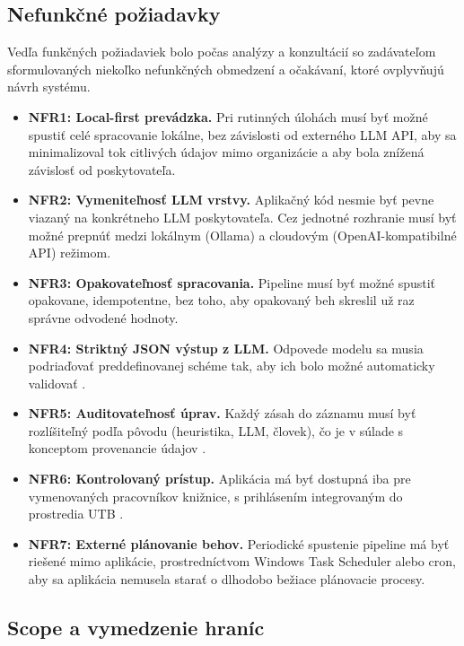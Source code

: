 \subsection{Nefunkčné požiadavky}

Vedľa funkčných požiadaviek bolo počas analýzy a konzultácií so zadávateľom sformulovaných niekoľko nefunkčných obmedzení a očakávaní, ktoré ovplyvňujú návrh systému.

\begin{itemize}
    \item \textbf{NFR1: Local-first prevádzka.} Pri rutinných úlohách musí byť možné spustiť celé spracovanie lokálne, bez závislosti od externého LLM API, aby sa minimalizoval tok citlivých údajov mimo organizácie a aby bola znížená závislosť od poskytovateľa.
    \item \textbf{NFR2: Vymeniteľnosť LLM vrstvy.} Aplikačný kód nesmie byť pevne viazaný na konkrétneho LLM poskytovateľa. Cez jednotné rozhranie musí byť možné prepnúť medzi lokálnym (Ollama) a cloudovým (OpenAI-kompatibilné API) režimom.
    \item \textbf{NFR3: Opakovateľnosť spracovania.} Pipeline musí byť možné spustiť opakovane, idempotentne, bez toho, aby opakovaný beh skreslil už raz správne odvodené hodnoty.
    \item \textbf{NFR4: Striktný JSON výstup z LLM.} Odpovede modelu sa musia podriaďovať preddefinovanej schéme tak, aby ich bolo možné automaticky validovať \cite{OpenAIStructuredOutputs,OllamaStructuredOutputs}.
    \item \textbf{NFR5: Auditovateľnosť úprav.} Každý zásah do záznamu musí byť rozlíšiteľný podľa pôvodu (heuristika, LLM, človek), čo je v súlade s konceptom provenancie údajov \cite{PROVOverview}.
    \item \textbf{NFR6: Kontrolovaný prístup.} Aplikácia má byť dostupná iba pre vymenovaných pracovníkov knižnice, s prihlásením integrovaným do prostredia UTB \cite{Konarik2025}.
    \item \textbf{NFR7: Externé plánovanie behov.} Periodické spustenie pipeline má byť riešené mimo aplikácie, prostredníctvom Windows Task Scheduler alebo cron, aby sa aplikácia nemusela starať o dlhodobo bežiace plánovacie procesy.
\end{itemize}

\subsection{Scope a vymedzenie hraníc}

